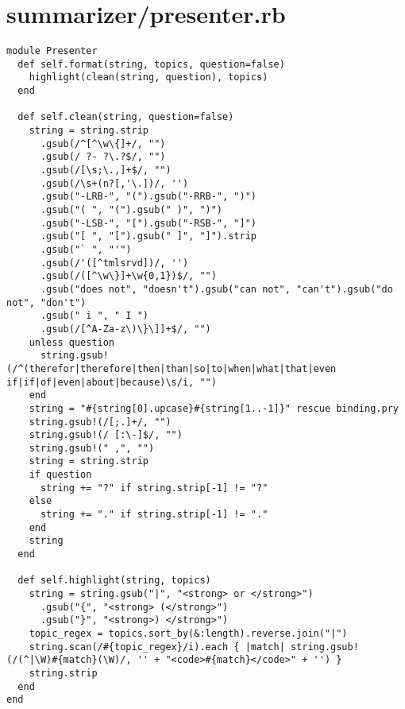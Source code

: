 \documentclass{article}
\begin{document}
\section*{summarizer/presenter.rb}
\begin{verbatim}
module Presenter
  def self.format(string, topics, question=false)
    highlight(clean(string, question), topics)
  end

  def self.clean(string, question=false)
    string = string.strip
      .gsub(/^[^\w\{]+/, "")
      .gsub(/ ?- ?\.?$/, "")
      .gsub(/[\s;\.,]+$/, "")
      .gsub(/\s+(n?[,'\.])/, '')
      .gsub("-LRB-", "(").gsub("-RRB-", ")")
      .gsub("( ", "(").gsub(" )", ")")
      .gsub("-LSB-", "[").gsub("-RSB-", "]")
      .gsub("[ ", "[").gsub(" ]", "]").strip
      .gsub("` ", "'")
      .gsub(/'([^tmlsrvd])/, '')
      .gsub(/([^\w\}]+\w{0,1})$/, "")
      .gsub("does not", "doesn't").gsub("can not", "can't").gsub("do not", "don't")
      .gsub(" i ", " I ")
      .gsub(/[^A-Za-z\)\}\]]+$/, "")
    unless question
      string.gsub!(/^(therefor|therefore|then|than|so|to|when|what|that|even if|if|of|even|about|because)\s/i, "")
    end
    string = "#{string[0].upcase}#{string[1..-1]}" rescue binding.pry
    string.gsub!(/[;.]+/, "")
    string.gsub!(/ [:\-]$/, "")
    string.gsub!(" ,", "")
    string = string.strip
    if question
      string += "?" if string.strip[-1] != "?"
    else
      string += "." if string.strip[-1] != "."
    end
    string
  end

  def self.highlight(string, topics)
    string = string.gsub("|", "<strong> or </strong>")
      .gsub("{", "<strong> (</strong>")
      .gsub("}", "<strong>) </strong>")
    topic_regex = topics.sort_by(&:length).reverse.join("|")
    string.scan(/#{topic_regex}/i).each { |match| string.gsub!(/(^|\W)#{match}(\W)/, '' + "<code>#{match}</code>" + '') }
    string.strip
  end
end


\end{verbatim}
\pagebreak
\end{document}
